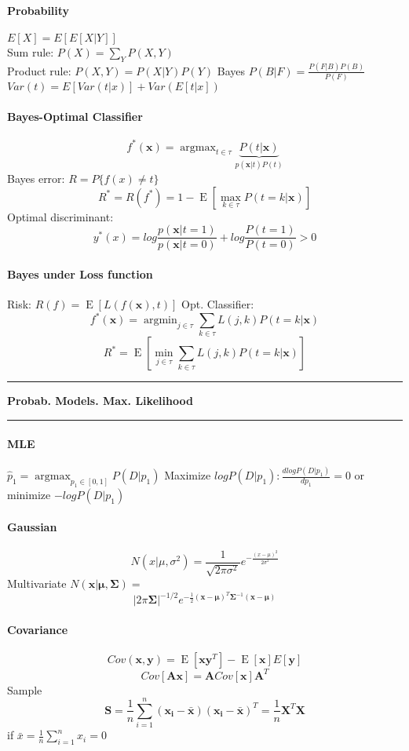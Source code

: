 \documentclass[7pt]{scrartcl}
\newlength{\secskip}
\renewcommand{\section}[1]{
  \vspace{\secskip}
  \hrule\vspace{.3em}
  \textbf{#1}
  \vspace{.3em}
  \hrule
  \vspace{\secskip}
}
\DeclareMathOperator*{\argmax}{argmax}
\DeclareMathOperator*{\argmin}{argmin}
\DeclareMathOperator{\E}{E}
\renewcommand{\vec}{\mathbf}
\begin{document}
\begin{multicols}{4}
\paragraph{Probability}
$E[X] = E[E[X|Y]]$ \\
Sum rule: $P(X) = \sum_Y P(X,Y)$\\
Product rule: $P(X,Y) = P(X|Y)P(Y)$
Bayes $P(B|F) = \frac{P(F|B)P(B)}{P(F)}$ \\
$Var(t) = E[Var(t|x)] + Var(E[t|x])$
\paragraph{Bayes-Optimal Classifier}
\[f^*(\vec x) = \argmax_{t \in \tau} \underbrace{P(t|\vec x)}_{p(\vec x|t) P(t)}\]
Bayes error: $R = P\{f(x) \neq t\}$
\[ R^* = R(f^*) = 1 - \E \left [ \max_{k\in\tau} P(t = k | \vec x) \right ] \]
Optimal discriminant:
\[y^*(x) = log \frac{p(\vec{x}|t=1)}{p(\vec{x}|t=0)} + log \frac{P(t=1)}{P(t=0)} > 0\]
\paragraph{Bayes under Loss function}
Risk: $ R(f) = \E \left [ L(f(\vec x), t) \right ]$
Opt. Classifier:
\[f^*(\vec x) = \argmin_{j \in \tau} \sum_{k \in \tau} L(j,k) P(t = k | \vec x) \]
\[ R^* = \E \left [ \min_{j\in\tau} \sum_{k \in \tau} L(j,k) P(t = k | \vec x) \right ] \]

\section{Probab. Models. Max. Likelihood}
\paragraph{MLE} $\hat{p}_1 = \argmax_{p_1 \in [0,1]}P(D|p_1)$ Maximize $logP(D|p_1) :  \frac{dlogP(D|p_1)}{dp_1} = 0$ or minimize $-logP(D|p_1)$
\paragraph{Gaussian}
\[N(x|\mu,\sigma^2) = \frac{1}{\sqrt{2\pi\sigma^2}} e^{-\frac{(x-\mu)^2}{2\sigma^2}}\]
Multivariate $N(\vec{x}|\vec{\mu},\vec{\Sigma}) =$
\[|2\pi\vec{\Sigma}|^{-1/2} e^{-\frac{1}{2}(\vec{x}-\vec{\mu})^T\vec{\Sigma}^{-1}(\vec{x}-\vec{\mu})}\]
\paragraph{Covariance}
$$Cov(\vec x, \vec y) = \E[\vec x \vec y ^ T] - \E[\vec x]E[\vec y]$$
$$Cov[\vec A \vec x] = \vec A Cov[\vec x] \vec A^T$$
Sample 
\[\vec{S} = \frac{1}{n} \sum_{i=1}^n (\vec{x_i - \bar{x}})(\vec{x_i - \bar{x}})^T=\frac{1}{n}\vec{X}^T\vec{X}\] if $\bar{x} = \frac{1}{n} \sum_{i=1}^nx_i = 0$

\end{multicols}
\end{document}
